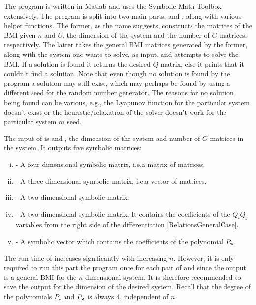 \documentclass[a4paper,12pt,twoside,BCOR=10mm]{scrbook}
\begin{document}
The program is written in Matlab and uses the Symbolic Math Toolbox extensively. The program is split into two main parts,  and , along with various helper functions. The former, as the name suggests, constructs the matrices of the BMI given $n$ and $U$, the dimension of the system and the number of $G$ matrices, respectively. The latter takes the general BMI matrices generated by the former, along with the system one wants to solve, as input, and attempts to solve the BMI. If a solution is found it returns the desired $Q$ matrix, else it prints that it couldn't find a solution. Note that even though no solution is found by the program a solution may still exist, which may perhaps be found by using a different seed for the random number generator. The reasons for no solution being found can be various, e.g., the Lyapunov function for the particular system doesn't exist or the heuristic/relaxation of the solver doesn't work for the particular system or seed.

The input of  is  and , the dimension of the system and number of $G$ matrices in the system. It outputs five symbolic matrices:
\begin{enumerate}[i)]
    \item {} - A four dimensional symbolic matrix, i.e.\@ a matrix of matrices.
    \item {} - A three dimensional symbolic matrix, i.e.\@ a vector of matrices.
    \item {} - A two dimensional symbolic matrix.
    \item {} - A two dimensional symbolic matrix. It contains the coefficients of the $Q_iQ_j$ variables from the right side of the differentiation \eqref{RelationsGeneralCase}.
    \item {} - A symbolic vector which contains the coefficients of the polynomial $P_{\mathbf{z}}$.
\end{enumerate}

The run time of  increases significantly with increasing $n$. However, it is only required to run this part the program once for each pair of  and  since the output is a general BMI for the $n$-dimensional system. It is therefore recommended to save the output for the dimension of the desired system. Recall that the degree of the polynomials $P_c$ and $P_{\mathbf{z}}$ is always 4, independent of $n$.
\end{document}
